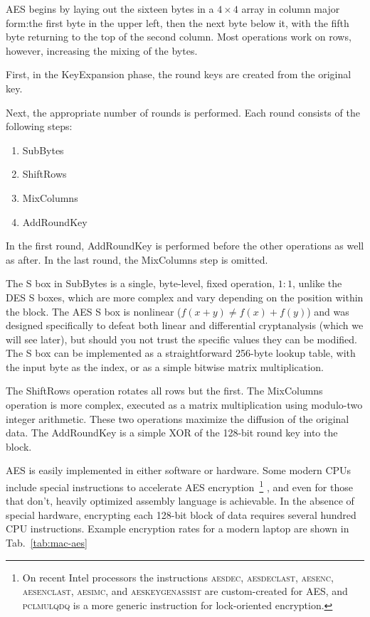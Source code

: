 \documentclass[%
 aip,
 jmp,%
 amsmath,amssymb,
 reprint,%
]{revtex4-1}
\begin{document}
AES begins by laying out the sixteen bytes in a $4\times 4$ array in column major form:the first byte in the upper left, then the next byte below it, with the fifth byte returning to the top of the second column. Most operations work on rows, however, increasing the mixing of the bytes.

First, in the KeyExpansion phase, the round keys are created from the original key.

Next, the appropriate number of rounds is performed. Each round consists of the following steps:

\begin{enumerate}
\item SubBytes
\item ShiftRows
\item MixColumns
\item AddRoundKey
\end{enumerate}

In the first round, AddRoundKey is performed before the other operations as well as after. In the last round, the MixColumns step is omitted.

The S box in SubBytes is a single, byte-level, fixed operation, $1:1$, unlike the DES S boxes, which are more complex and vary depending on the position within the block. The AES S box is nonlinear ($f(x+y) \ne f(x)+f(y)$) and was designed specifically to defeat both linear and differential cryptanalysis (which we will see later), but should you not trust the specific values they can be modified. The S box can be implemented as a straightforward 256-byte lookup table, with the input byte as the index, or as a simple bitwise matrix multiplication.

The ShiftRows operation rotates all rows but the first. The MixColumns operation is more complex, executed as a matrix multiplication using modulo-two integer arithmetic. These two operations maximize the diffusion of the original data. The AddRoundKey is a simple XOR of the 128-bit round key into the block.

AES is easily implemented in either software or hardware. Some modern
CPUs include special instructions to accelerate AES
encryption~\footnote{On recent Intel processors the instructions
  \textsc{aesdec}, \textsc{aesdeclast}, \textsc{aesenc},
  \textsc{aesenclast}, \textsc{aesimc}, and \textsc{aeskeygenassist}
  are custom-created for AES, and \textsc{pclmulqdq} is a more generic
  instruction for lock-oriented encryption.} , and even for those that
don't, heavily optimized assembly language is achievable.  In the
absence of special hardware, encrypting each 128-bit block of data
requires several hundred CPU instructions. Example encryption rates
for a modern laptop are shown in Tab.~\ref{tab:mac-aes}
\end{document}
